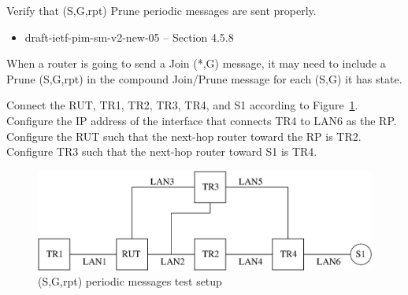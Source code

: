 \documentclass[11pt]{report}
\begin{document}
Verify that (S,G,rpt) Prune periodic messages are sent properly.

\begin{itemize}
  \item draft-ietf-pim-sm-v2-new-05 -- Section 4.5.8
\end{itemize}

When a router is going to send a Join (*,G) message, it may need to include a
Prune (S,G,rpt) in the compound Join/Prune message for each (S,G) it has
state.

Connect the RUT, TR1, TR2, TR3, TR4, and S1 according to
Figure~\ref{fig:pim_test_4_8_sg_rpt_periodic_messages}.
Configure the IP address of the interface that connects TR4 to LAN6 as the RP.
Configure the RUT such that the next-hop router toward the RP is TR2.
Configure TR3 such that the next-hop router toward S1 is TR4.

\begin{figure}[htbp]
  \begin{center}
    \includegraphics[scale=0.8]{figs/pim_test_4_8_sg_rpt_periodic_messages}
    \caption{(S,G,rpt) periodic messages test setup}
    \label{fig:pim_test_4_8_sg_rpt_periodic_messages}
  \end{center}
\end{figure}


\end{document}
